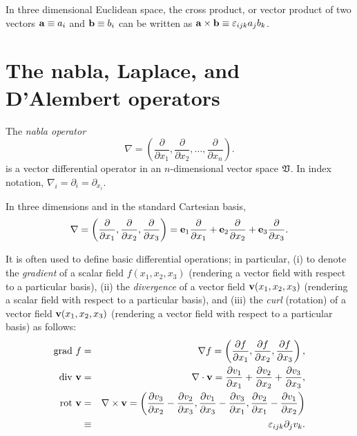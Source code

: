 In three dimensional Euclidean space,
the cross product, or vector product
of two vectors
${\bf a}\equiv a_i$
and
${\bf b}\equiv b_i$
can be written as
${\bf a} \times {\bf b}\equiv \varepsilon_{ijk}a_jb_k$.

\section{The nabla, Laplace, and D'Alembert operators}

The {\em nabla operator}
\begin{equation}
\nabla =\left(
\frac{\partial }{\partial x_1},
\frac{\partial }{\partial x_2},
\ldots ,
\frac{\partial }{\partial x_n}
\right).
\end{equation}
is a vector differential operator in an $n$-dimensional vector space $\frak V$.
In index notation, $\nabla_i  =\partial_i =\partial_{x_i}$.

In three dimensions and in the standard Cartesian basis,
\begin{equation}
\nabla = \left(
\frac{\partial }{\partial x_1},
\frac{\partial }{\partial x_2},
\frac{\partial }{\partial x_3}
\right)
={\bf e}_1\frac{\partial }{\partial x_1}
+{\bf e}_2\frac{\partial }{\partial x_2}
+{\bf e}_3\frac{\partial }{\partial x_3}
.
\end{equation}

It is often used to define basic differential operations;
in particular, (i) to denote the {\em gradient} of a scalar field $f(x_1,x_2,x_3)$ (rendering a vector field with respect to a particular basis),
(ii) the {\em divergence} of a vector field ${\bf v}(x_1,x_2,x_3)$
(rendering a scalar field with respect to a particular basis), and
(iii) the {\em curl} (rotation) of a vector field  ${\bf v}(x_1,x_2,x_3)$ (rendering a vector field with respect to a particular basis)
as follows:
\begin{eqnarray}
\textrm{grad } f &=& \nabla f = \left(
\frac{\partial f}{\partial x_1},
\frac{\partial f}{\partial x_2},
\frac{\partial f}{\partial x_3}
\right)  ,\\
\textrm{div }  {\bf v} &=& \nabla \cdot {\bf v} =
\frac{\partial v_1}{\partial x_1}+
\frac{\partial v_2}{\partial x_2}+
\frac{\partial v_3}{\partial x_3}
  ,\\
\textrm{rot } {\bf v} &=& \nabla \times {\bf v} = \left(
\frac{\partial v_3}{\partial x_2}-
\frac{\partial v_2}{\partial x_3}
,
\frac{\partial v_1}{\partial x_3}-
\frac{\partial v_3}{\partial x_1}
,
\frac{\partial v_2}{\partial x_1}-
\frac{\partial v_1}{\partial x_2}
\right)          \\
&\equiv& \varepsilon_{ijk} \partial_j v_k.
\end{eqnarray}


